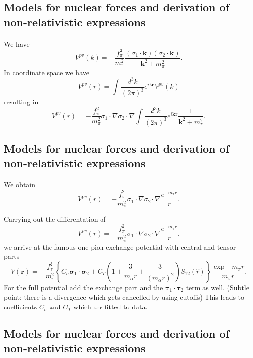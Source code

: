\documentclass[%
twoside,                 %
final,                   %
10pt]{article}
\begin{document}
\subsection*{Models for nuclear forces and derivation of non-relativistic expressions}

\paragraph{}
We have
\[
V^{pv}(k)=-\frac{f_{\pi}^{2}}{m_{\pi}^{2}}
\frac{(\sigma_{1}\cdot\mathbf{k})(\sigma_{2}\cdot\mathbf{k})}{\mathbf{k}^{2}+m_{\pi}^{2}}.
\]
In coordinate space we have
\[
V^{pv}(r)=\int\frac{d^3k}{(2\pi)^3}e^{i\mathbf{kr}}V^{pv}(k)
\]
resulting in
\[
  V^{pv}(r)=-\frac{f_{\pi}^{2}}{m_{\pi}^{2}}
\sigma_{1}\cdot{\nabla}\sigma_{2}\cdot{\nabla}
\int\frac{d^3k}{(2\pi)^3}e^{i\mathbf{kr}}\frac{1}{\mathbf{k}^{2}+m_{\pi}^{2}}.
\]



\subsection*{Models for nuclear forces and derivation of non-relativistic expressions}

\paragraph{}
We obtain
\[
V^{pv}(r)=-\frac{f_{\pi}^{2}}{m_{\pi}^{2}}\sigma_{1}\cdot{\nabla}\sigma_{2}\cdot{\nabla}\frac{e^{-m_{\pi}r}}{r}.
\]

Carrying out the differentation of
\[
V^{pv}(r)=-\frac{f_{\pi}^{2}}{m_{\pi}^{2}}\sigma_{1}\cdot{\nabla}\sigma_{2}\cdot{\nabla}\frac{e^{-m_{\pi}r}}{r}.
\]
we arrive at the famous one-pion exchange potential with central and tensor parts
\[
V(\mathbf{r})= -\frac{f_{\pi}^{2}}{m_{\pi}^{2}}\left\{C_{\sigma}\mathbf{\sigma}_1\cdot\mathbf{\sigma}_2+ C_T \left( 1 + \frac{3}{m_\alpha r} + \frac{3}{\left(m_\alpha r\right)^2}\right) S_{12}(\hat r)\right\}\frac{\exp{-m_\pi r}}{m_\pi r}.
\]
For the full potential add the exchange part and the $\mathbf{\tau}_1\cdot\mathbf{\tau}_2$ term as well. (Subtle point: there is a divergence which gets cancelled by using cutoffs) This leads to coefficients $C_{\sigma}$ and $C_T$ which are fitted to data.



\subsection*{Models for nuclear forces and derivation of non-relativistic expressions}
\end{document}
